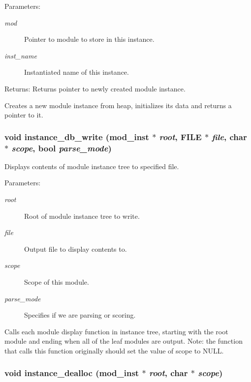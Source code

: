\begin{Desc}
\item[Parameters:]
\begin{description}
\item[{\em mod}]Pointer to module to store in this instance. \item[{\em inst\_\-name}]Instantiated name of this instance.\end{description}
\end{Desc}
\begin{Desc}
\item[Returns:]Returns pointer to newly created module instance.\end{Desc}
Creates a new module instance from heap, initializes its data and returns a pointer to it. 
\subsubsection{\setlength{\rightskip}{0pt plus 5cm}void instance\_\-db\_\-write ({\bf mod\_\-inst} $\ast$ {\em root}, FILE $\ast$ {\em file}, char $\ast$ {\em scope}, {\bf bool} {\em parse\_\-mode})}\label{instance_8c_a10}


Displays contents of module instance tree to specified file. 

\begin{Desc}
\item[Parameters:]
\begin{description}
\item[{\em root}]Root of module instance tree to write. \item[{\em file}]Output file to display contents to. \item[{\em scope}]Scope of this module. \item[{\em parse\_\-mode}]Specifies if we are parsing or scoring.\end{description}
\end{Desc}
Calls each module display function in instance tree, starting with the root module and ending when all of the leaf modules are output. Note: the function that calls this function originally should set the value of scope to NULL. 
\subsubsection{\setlength{\rightskip}{0pt plus 5cm}void instance\_\-dealloc ({\bf mod\_\-inst} $\ast$ {\em root}, char $\ast$ {\em scope})}\label{instance_8c_a12}


